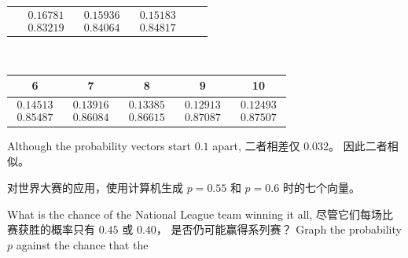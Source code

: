 \begin{exercises}
\begin{answer}
\begin{exparts}
\begin{center}
\begin{tabular}{c|ccccc}
               &$\begin{array}{c}   0.16781 \\ 0.83219 \end{array}$
               &$\begin{array}{c}   0.15936 \\ 0.84064 \end{array}$
               &$\begin{array}{c}   0.15183 \\ 0.84817 \end{array}$
             \end{tabular}                                         \\[1ex]
             \begin{tabular}{|ccccc}
               6  &7  &8  &9 &10 \\ 
               \hline
               $\begin{array}{c}  0.14513 \\ 0.85487  \end{array}$
               &$\begin{array}{c}  0.13916 \\ 0.86084  \end{array}$
               &$\begin{array}{c}  0.13385 \\ 0.86615  \end{array}$
               &$\begin{array}{c}  0.12913 \\ 0.87087  \end{array}$
               &$\begin{array}{c}  0.12493 \\ 0.87507  \end{array}$
             \end{tabular}
           \end{center}
          \partsitem Although the probability vectors start $0.1$ apart,
            二者相差仅 $0.032$。
            因此二者相似。
       \end{exparts}
     \end{answer}  
  \item 
    对世界大赛的应用，使用计算机生成
    $p=0.55$ 和 $p=0.6$ 时的七个向量。
    \begin{exparts}
      \partsitem What is the chance of the National League team winning it all,
        尽管它们每场比赛获胜的概率只有 $0.45$ 或 $0.40$，
        是否仍可能赢得系列赛？
      \partsitem Graph the probability $p$ against the chance that the

\end{exparts}
\end{exercises}

